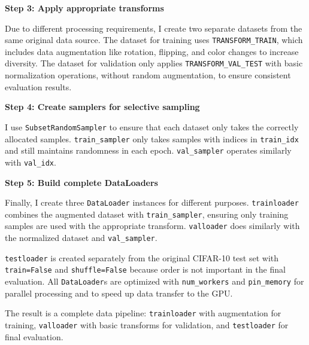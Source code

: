 \documentclass[12pt, a4paper, openany]{report}
\begin{document}
 \noindent\textbf{Step 3: Apply appropriate transforms} %

 Due to different processing requirements, I create two separate datasets from the same original data source. The dataset for training uses \texttt{TRANSFORM\_TRAIN}, which includes data augmentation like rotation, flipping, and color changes to increase diversity. The dataset for validation only applies \texttt{TRANSFORM\_VAL\_TEST} with basic normalization operations, without random augmentation, to ensure consistent evaluation results. %

 \noindent\textbf{Step 4: Create samplers for selective sampling} %

 I use \texttt{SubsetRandomSampler} to ensure that each dataset only takes the correctly allocated samples. \texttt{train\_sampler} only takes samples with indices in \texttt{train\_idx} and still maintains randomness in each epoch. \texttt{val\_sampler} operates similarly with \texttt{val\_idx}. %

 \noindent\textbf{Step 5: Build complete DataLoaders} %

 Finally, I create three \texttt{DataLoader} instances for different purposes. \texttt{trainloader} combines the augmented dataset with \texttt{train\_sampler}, ensuring only training samples are used with the appropriate transform. \texttt{valloader} does similarly with the normalized dataset and \texttt{val\_sampler}.

 \texttt{testloader} is created separately from the original CIFAR-10 test set with \texttt{train=False} and \texttt{shuffle=False} because order is not important in the final evaluation. All \texttt{DataLoader}s are optimized with \texttt{num\_workers} and \texttt{pin\_memory} for parallel processing and to speed up data transfer to the GPU.

 The result is a complete data pipeline: \texttt{trainloader} with augmentation for training, \texttt{valloader} with basic transforms for validation, and \texttt{testloader} for final evaluation.
\end{document}
